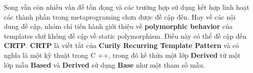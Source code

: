 Song vẫn còn nhiều vấn đề tồn đọng và các trường hợp sử dụng kết hợp linh hoạt các thành phần trong metaprograming chưa được đề cập đến. Hay về các nội dung đề cập, nhóm chỉ tiến hành giới thiệu về \textbf{polymorphic behavior} của templates chứ không đề cập về static polymorphism. Điều này có thể đề cập đến \textbf{CRTP}. \textbf{CRTP} là viết tắt của \textbf{Curily Recurring Template Pattern} và có nghĩa là một kỹ thuật trong C ++, trong đó kế thừa một lớp \textbf{Derived} từ một lớp mẫu \textbf{Based} và \textbf{Derived} sử dụng \textbf{Base} như một tham số mẫu.